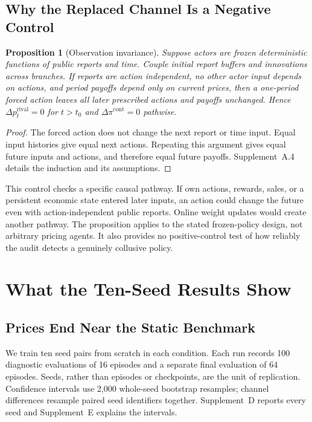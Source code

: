 \documentclass{article}
\newtheorem{proposition}{Proposition}
\begin{document}
\subsection{Why the Replaced Channel Is a Negative Control}

\begin{proposition}[Observation invariance]\label{prop:invariance}
Suppose actors are frozen deterministic functions of public reports and time. Couple initial report buffers and innovations across branches. If reports are action independent, no other actor input depends on actions, and period payoffs depend only on current prices, then a one-period forced action leaves all later prescribed actions and payoffs unchanged. Hence $\Delta p_t^{\mathrm{rival}}=0$ for $t>t_0$ and $\Delta\pi^{\mathrm{cont}}=0$ pathwise.
\end{proposition}

\begin{proof}
The forced action does not change the next report or time input. Equal input histories give equal next actions. Repeating this argument gives equal future inputs and actions, and therefore equal future payoffs. Supplement~A.4 details the induction and its assumptions.
\end{proof}

This control checks a specific causal pathway. If own actions, rewards, sales, or a persistent economic state entered later inputs, an action could change the future even with action-independent public reports. Online weight updates would create another pathway. The proposition applies to the stated frozen-policy design, not arbitrary pricing agents. It also provides no positive-control test of how reliably the audit detects a genuinely collusive policy.

\section{What the Ten-Seed Results Show}

\subsection{Prices End Near the Static Benchmark}

We train ten seed pairs from scratch in each condition. Each run records 100 diagnostic evaluations of 16 episodes and a separate final evaluation of 64 episodes. Seeds, rather than episodes or checkpoints, are the unit of replication. Confidence intervals use 2,000 whole-seed bootstrap resamples; channel differences resample paired seed identifiers together. Supplement~D reports every seed and Supplement~E explains the intervals.
\end{document}
